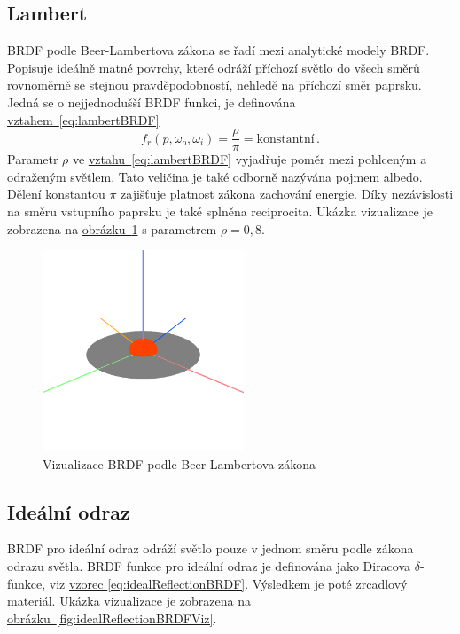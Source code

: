 \documentclass[czech,master]{diploma}
\newcommand{\point}{p}
\newcommand{\brdf}{f_r\left(\point,\omega_{o},\omega_{i}\right)}
\newcommand{\alb}{\rho}
\begin{document}
\subsection{Lambert} \label{sec:Lambert}
BRDF podle Beer-Lambertova zákona se řadí mezi analytické modely BRDF\@. Popisuje ideálně matné povrchy, které odráží příchozí světlo do všech směrů rovnoměrně se stejnou pravděpodobností, nehledě na příchozí směr paprsku. Jedná se o nejjednodušší BRDF funkci, je definována \hyperref[eq:lambertBRDF]{vztahem~\ref{eq:lambertBRDF}}~\cite{Koppal2014}
\begin{equation} \label{eq:lambertBRDF}
  \brdf = \frac{\alb}{\pi} = \text{konstantní}\,.
\end{equation}
Parametr \(\alb\) ve \hyperref[eq:lambertBRDF]{vztahu~\ref{eq:lambertBRDF}} vyjadřuje poměr mezi pohlceným a odraženým světlem. Tato veličina je také odborně nazývána pojmem albedo. Dělení konstantou \(\pi\) zajišťuje platnost zákona zachování energie. Díky nezávislosti na směru vstupního paprsku je také splněna reciprocita. Ukázka vizualizace je zobrazena na \hyperref[fig:lambertBRDFRender]{obrázku~\ref{fig:lambertBRDFRender}} s parametrem \(\alb = 0{,}8\).

\begin{figure}[ht]%
  \centering
  \includegraphics[width=6cm]{Figures/visualizations/brdfLambert.png}%
  \caption{Vizualizace BRDF podle Beer-Lambertova zákona}%
  \label{fig:lambertBRDFRender}%
\end{figure}

\subsection{Ideální odraz} \label{sec:idealReflection}
BRDF pro ideální odraz odráží světlo pouze v jednom směru podle zákona odrazu světla. BRDF funkce pro ideální odraz je definována jako Diracova \(\delta\)-funkce, viz \hyperref[eq:idealReflectionBRDF]{vzorec \ref{eq:idealReflectionBRDF}}. Výsledkem je poté zrcadlový materiál. Ukázka vizualizace je zobrazena na \hyperref[fig:idealReflectionBRDFViz]{obrázku~\ref{fig:idealReflectionBRDFViz}}.
\end{document}

